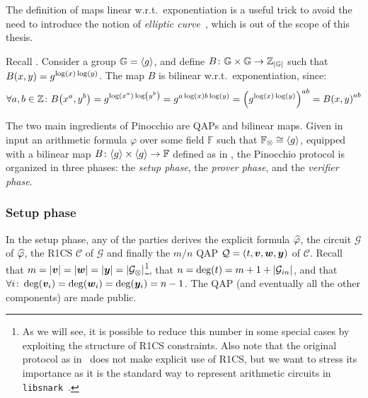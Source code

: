 The definition of maps linear w.r.t.\ exponentiation is a useful trick to avoid the need to 
introduce the notion of \emph{elliptic curve}~\cite{Silverman2009}, which is out of the scope 
of this thesis.

\begin{example}\label{ex:bilinear_map}
  Recall .
  Consider a group \(\mathbb{G} = \left\langle g\right\rangle\), and define 
  \(B\colon \mathbb{G} \times \mathbb{G} \to \mathbb{Z}_{\left\lvert\mathbb{G}\right\rvert}\) such that 
  \(\call{B}{x, y} = g^{\call{\log}{x}\call{\log}{y}}\). The map \(B\) is bilinear 
  w.r.t.\ exponentiation, since:
  \[
    \forall a,b \in \mathbb{Z}\colon \call{B}{x^a, y^b} = g^{\call{\log}{x^a}\call{\log}{y^b}} = 
    g^{a\call{\log}{x}b\call{\log}{y}} = \Parens*{g^{\call{\log}{x}\call{\log}{y}}}^{ab}
    = \call{B}{x, y}^{ab}
  \]
\end{example}

The two main ingredients of Pinocchio are QAPs and bilinear maps.
Given in input an arithmetic formula \(\varphi \) over some field \(\mathbb{F}\) such that 
\(\mathbb{F}_{\otimes} \cong \left\langle g\right\rangle\),
equipped with a bilinear map \(B\colon \gengroup{g} \times \gengroup{g} \to \mathbb{F}\) defined as 
in , the Pinocchio protocol is organized in three phases: the 
\emph{setup phase}, the \emph{prover phase}, and the \emph{verifier phase}.

\subsubsection*{Setup phase}
In the setup phase, any of the parties derives the explicit formula \(\widehat{\varphi}\), 
the circuit \(\mathcal{G}\) of \(\widehat{\varphi}\), the R1CS \(\mathcal{C}\) of \(\mathcal{G}\) 
and finally the \(m/n\) QAP \(\mathcal{Q} = \left(t, \bm{v}, \bm{w}, \bm{y}\right)\) of \(\mathcal{C}\).
Recall that \(m = \left\lvert\bm{v}\right\rvert = \left\lvert\bm{w}\right\rvert = \left\lvert\bm{y}\right\rvert = \left\lvert\mathcal{G}_{\otimes}\right\rvert\)\footnote{
  As we will see, it is possible to reduce this number in some special cases by exploiting the 
  structure of R1CS constraints.
  Also note that the original protocol as in~\cite{ParnoGHR2013} does not make explicit use of 
  R1CS, but we want to stress its importance as it is the standard way to represent arithmetic 
  circuits in \texttt{libsnark}~\cite{SassonCTV2013}.
  }, 
that \(n = \call{\deg}{t} = m + 1 + \abs{\mathcal{G}_{in}}\), and that 
\(\forall i\colon \call{\deg}{\bm{v}_i} = \call{\deg}{\bm{w}_i} = \call{\deg}{\bm{y}_i} = n - 1\).
The QAP (and eventually all the other components) are made public.


